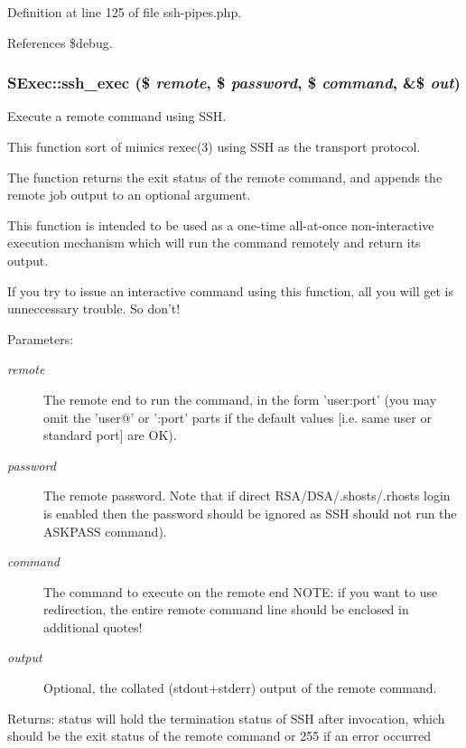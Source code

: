 Definition at line 125 of file ssh-pipes.php.

References \$debug.
\subsubsection{\setlength{\rightskip}{0pt plus 5cm}SExec::ssh\_\-exec (\$ {\em remote}, \$ {\em password}, \$ {\em command}, \&\$ {\em out})}\label{classSExec_a3}


Execute a remote command using SSH. 

This function sort of mimics rexec(3) using SSH as the transport protocol.

The function returns the exit status of the remote command, and appends the remote job output to an optional argument.

This function is intended to be used as a one-time all-at-once non-interactive execution mechanism which will run the command remotely and return its output.

If you try to issue an interactive command using this function, all you will get is unneccessary trouble. So don't!

\begin{Desc}
\item[Parameters:]
\begin{description}
\item[{\em remote}]The remote end to run the command, in the form 'user:port' (you may omit the 'user@' or ':port' parts if the default values [i.e. same user or standard port] are OK). \item[{\em password}]The remote password. Note that if direct RSA/DSA/.shosts/.rhosts login is enabled then the password should be ignored as SSH should not run the ASKPASS command). \item[{\em command}]The command to execute on the remote end NOTE: if you want to use redirection, the entire remote command line should be enclosed in additional quotes! \item[{\em output}]Optional, the collated (stdout+stderr) output of the remote command. \end{description}
\end{Desc}
\begin{Desc}
\item[Returns:]status will hold the termination status of SSH after invocation, which should be the exit status of the remote command or 255 if an error occurred \end{Desc}



